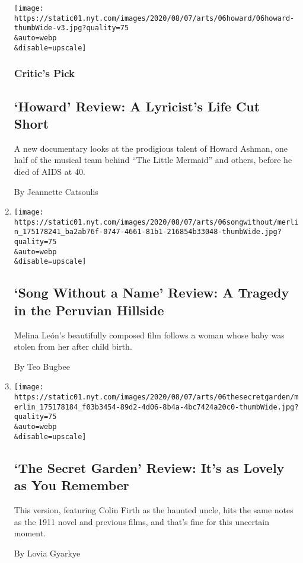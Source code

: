\begin{enumerate}
  \texttt{[image: https://static01.nyt.com/images/2020/08/07/arts/06howard/06howard-thumbWide-v3.jpg?quality=75\\\&auto=webp\\\&disable=upscale]}

  \hypertarget{critics-pick-1}{%
  \subsubsection{Critic's Pick}\label{critics-pick-1}}

  \hypertarget{howard-review-a-lyricists-life-cut-short}{%
  \subsection{`Howard' Review: A Lyricist's Life Cut
  Short}\label{howard-review-a-lyricists-life-cut-short}}

  A new documentary looks at the prodigious talent of Howard Ashman, one
  half of the musical team behind ``The Little Mermaid'' and others,
  before he died of AIDS at 40.

  By Jeannette Catsoulis
\item
  \href{/2020/08/06/movies/song-without-a-name-review.html}{}

  \texttt{[image: https://static01.nyt.com/images/2020/08/07/arts/06songwithout/merlin\_175178241\_ba2ab76f-0747-4661-81b1-216854b33048-thumbWide.jpg?quality=75\\\&auto=webp\\\&disable=upscale]}

  \hypertarget{song-without-a-name-review-a-tragedy-in-the-peruvian-hillside}{%
  \subsection{`Song Without a Name' Review: A Tragedy in the Peruvian
  Hillside}\label{song-without-a-name-review-a-tragedy-in-the-peruvian-hillside}}

  Melina León's beautifully composed film follows a woman whose baby was
  stolen from her after child birth.

  By Teo Bugbee
\item
  \href{/2020/08/06/movies/the-secret-garden-review.html}{}

  \texttt{[image: https://static01.nyt.com/images/2020/08/07/arts/06thesecretgarden/merlin\_175178184\_f03b3454-89d2-4d06-8b4a-4bc7424a20c0-thumbWide.jpg?quality=75\\\&auto=webp\\\&disable=upscale]}

  \hypertarget{the-secret-garden-review-its-as-lovely-as-you-remember}{%
  \subsection{`The Secret Garden' Review: It's as Lovely as You
  Remember}\label{the-secret-garden-review-its-as-lovely-as-you-remember}}

  This version, featuring Colin Firth as the haunted uncle, hits the
  same notes as the 1911 novel and previous films, and that's fine for
  this uncertain moment.

  By Lovia Gyarkye
\end{enumerate}

